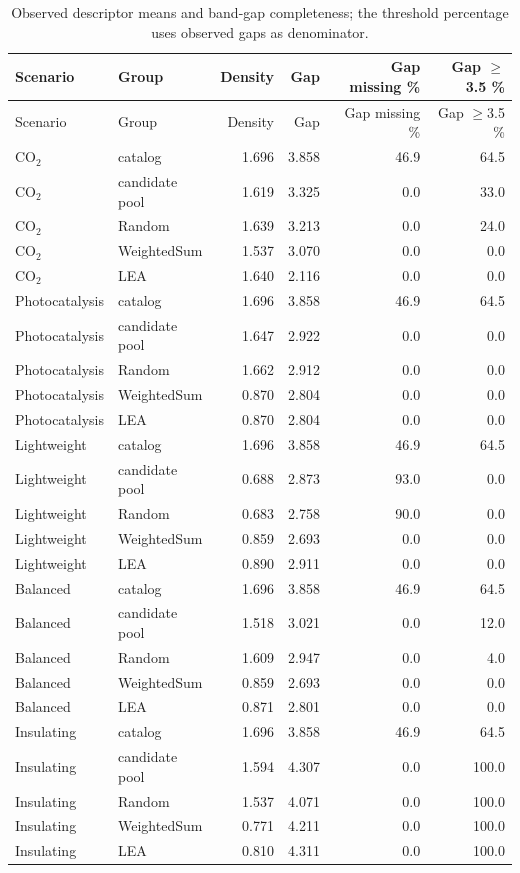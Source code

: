 \documentclass[11pt,a4paper]{article}
\begin{document}
\begin{footnotesize}\begin{longtable}{llrrrr}
\caption{Observed descriptor means and band-gap completeness; the threshold percentage uses observed gaps as denominator.}\\
\toprule
Scenario & Group & Density & Gap & Gap missing \% & Gap $\geq$3.5 \%\\\midrule\endfirsthead
\toprule Scenario & Group & Density & Gap & Gap missing \% & Gap $\geq$3.5 \%\\\midrule\endhead
CO$_2$ & catalog & 1.696 & 3.858 & 46.9 & 64.5\\
CO$_2$ & candidate pool & 1.619 & 3.325 & 0.0 & 33.0\\
CO$_2$ & Random & 1.639 & 3.213 & 0.0 & 24.0\\
CO$_2$ & WeightedSum & 1.537 & 3.070 & 0.0 & 0.0\\
CO$_2$ & LEA & 1.640 & 2.116 & 0.0 & 0.0\\
Photocatalysis & catalog & 1.696 & 3.858 & 46.9 & 64.5\\
Photocatalysis & candidate pool & 1.647 & 2.922 & 0.0 & 0.0\\
Photocatalysis & Random & 1.662 & 2.912 & 0.0 & 0.0\\
Photocatalysis & WeightedSum & 0.870 & 2.804 & 0.0 & 0.0\\
Photocatalysis & LEA & 0.870 & 2.804 & 0.0 & 0.0\\
Lightweight & catalog & 1.696 & 3.858 & 46.9 & 64.5\\
Lightweight & candidate pool & 0.688 & 2.873 & 93.0 & 0.0\\
Lightweight & Random & 0.683 & 2.758 & 90.0 & 0.0\\
Lightweight & WeightedSum & 0.859 & 2.693 & 0.0 & 0.0\\
Lightweight & LEA & 0.890 & 2.911 & 0.0 & 0.0\\
Balanced & catalog & 1.696 & 3.858 & 46.9 & 64.5\\
Balanced & candidate pool & 1.518 & 3.021 & 0.0 & 12.0\\
Balanced & Random & 1.609 & 2.947 & 0.0 & 4.0\\
Balanced & WeightedSum & 0.859 & 2.693 & 0.0 & 0.0\\
Balanced & LEA & 0.871 & 2.801 & 0.0 & 0.0\\
Insulating & catalog & 1.696 & 3.858 & 46.9 & 64.5\\
Insulating & candidate pool & 1.594 & 4.307 & 0.0 & 100.0\\
Insulating & Random & 1.537 & 4.071 & 0.0 & 100.0\\
Insulating & WeightedSum & 0.771 & 4.211 & 0.0 & 100.0\\
Insulating & LEA & 0.810 & 4.311 & 0.0 & 100.0\\
\bottomrule\end{longtable}\end{footnotesize}
\end{document}
